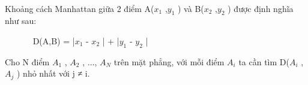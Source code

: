  

Khoảng cách Manhattan giữa 2 điểm A($x_{1}$ ,$y_{1}$ ) và B($x_{2}$ ,$y_{2}$ ) được định nghĩa như sau:

        D(A,B) = |$x_{1}$ - $x_{2}$ | + |$y_{1}$ - $y_{2}$ |

Cho N điểm $A_{1}$ , $A_{2}$ , ..., $A_{N}$ trên mặt phẳng, với mỗi điểm $A_{i}$ ta cần tìm D($A_{i}$ , $A_{j}$ ) nhỏ nhất với j ≠ i.